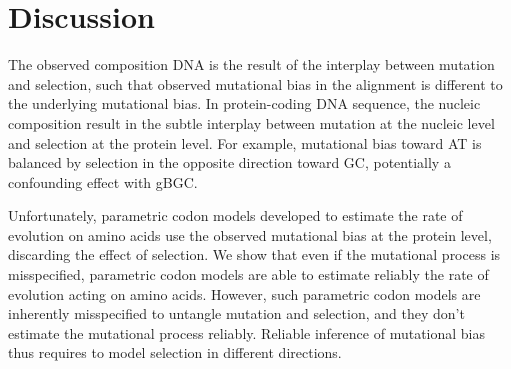 \begin{table}[H]
    \centering
    \noindent{}
    \caption[Estimated parameters]{
    Nucleoprotein alignment of 498 amino acids available for 180 species (left column).
    Lactamase alignment of 263 amino acids available for 85 species (right column).
    }
    \label{table-mut-bias:estimation}
\end{table}


\section{Discussion}

The observed composition \acrshort{DNA} is the result of the interplay between mutation and selection, such that observed mutational bias in the alignment is different to the underlying mutational bias.
In protein-coding \acrshort{DNA} sequence, the nucleic composition result in the subtle interplay between mutation at the nucleic level and selection at the protein level.
For example, mutational bias toward AT is balanced by selection in the opposite direction toward GC, potentially a confounding effect with \acrshort{gBGC}.

Unfortunately, parametric codon models developed to estimate the rate of evolution on amino acids use the observed mutational bias at the protein level, discarding the effect of selection.
We show that even if the mutational process is misspecified, parametric codon models are able to estimate reliably the rate of evolution acting on amino acids.
However, such parametric codon models are inherently misspecified to untangle mutation and selection, and they don't estimate the mutational process reliably.
Reliable inference of mutational bias thus requires to model selection in different directions.


